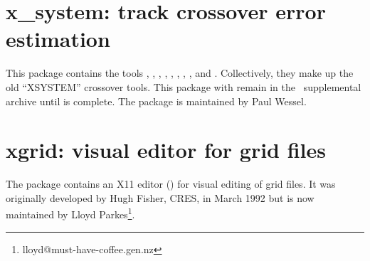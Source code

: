 \section{x\_system: track crossover error estimation}

This package contains the tools ,
, , , ,
, , , and
.
Collectively, they make up the old ``XSYSTEM'' crossover tools.  This
package with remain in the \GMT\ supplemental archive until  is complete.
The package is maintained by Paul Wessel.

\section{xgrid: visual editor for grid files}

The package contains an X11 editor () for visual
editing of grid files.  It was originally developed by Hugh Fisher, CRES,
in March 1992 but is now maintained by Lloyd Parkes\footnote{lloyd@must-have-coffee.gen.nz}.
